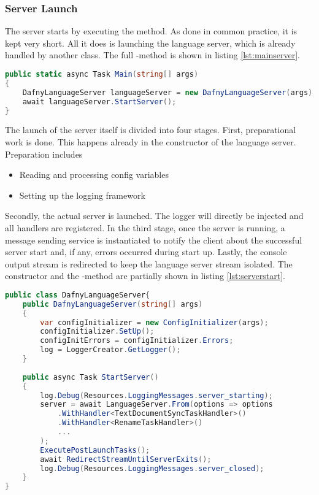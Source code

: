 \subsubsection{Server Launch}
The server starts by executing the  method.
As done in common practice, it is kept very short.
All it does is launching the language server, which is already handled by another class.
The full -method is shown in listing \ref{lst:mainserver}.

\begin{lstlisting}[language=csharp, caption={Main Function}, captionpos=b, label={lst:mainserver}]
public static async Task Main(string[] args)
{
    DafnyLanguageServer languageServer = new DafnyLanguageServer(args);
    await languageServer.StartServer();
}
\end{lstlisting}

The launch of the server itself is divided into four stages.
First, preparational work is done.
This happens already in the constructor of the language server.
Preparation includes
\begin{itemize}
    \item Reading and processing config variables
    \item Setting up the logging framework
\end{itemize}
Secondly, the actual server is launched.
The logger will directly be injected and all handlers are registered.
In the third stage, once the server is running, a message sending service is instantiated to notify the client about the successful server start and, if any, errors occurred during start up.
Lastly, the console output stream is redirected to keep the language server stream isolated.
The constructor and the -method are partially shown in listing \ref{lst:serverstart}.

\begin{lstlisting}[language=csharp, caption={Starting the Language Server}, captionpos=b, label={lst:serverstart}]
public class DafnyLanguageServer{
    public DafnyLanguageServer(string[] args)
    {
        var configInitializer = new ConfigInitializer(args);
        configInitializer.SetUp();
        configInitErrors = configInitializer.Errors;
        log = LoggerCreator.GetLogger();
    }
        
    public async Task StartServer()
    {
        log.Debug(Resources.LoggingMessages.server_starting);
        server = await LanguageServer.From(options => options
            .WithHandler<TextDocumentSyncTaskHandler>()
            .WithHandler<RenameTaskHandler>()
            ...
        );
        ExecutePostLaunchTasks();
        await RedirectStreamUntilServerExits();
        log.Debug(Resources.LoggingMessages.server_closed);
    }
}
\end{lstlisting}

